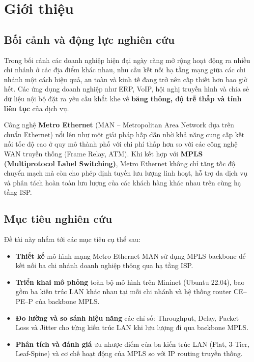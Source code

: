 \chapter{Giới thiệu}

\section{Bối cảnh và động lực nghiên cứu}

Trong bối cảnh các doanh nghiệp hiện đại ngày càng mở rộng hoạt động ra nhiều chi nhánh ở các địa điểm khác nhau, nhu cầu kết nối hạ tầng mạng giữa các chi nhánh một cách hiệu quả, an toàn và kinh tế đang trở nên cấp thiết hơn bao giờ hết. Các ứng dụng doanh nghiệp như ERP, VoIP, hội nghị truyền hình và chia sẻ dữ liệu nội bộ đặt ra yêu cầu khắt khe về \textbf{băng thông, độ trễ thấp và tính liên tục} của dịch vụ.

Công nghệ \textbf{Metro Ethernet} (MAN – Metropolitan Area Network dựa trên chuẩn Ethernet) nổi lên như một giải pháp hấp dẫn nhờ khả năng cung cấp kết nối tốc độ cao ở quy mô thành phố với chi phí thấp hơn so với các công nghệ WAN truyền thống (Frame Relay, ATM). Khi kết hợp với \textbf{MPLS (Multiprotocol Label Switching)}, Metro Ethernet không chỉ tăng tốc độ chuyển mạch mà còn cho phép định tuyến lưu lượng linh hoạt, hỗ trợ đa dịch vụ và phân tách hoàn toàn lưu lượng của các khách hàng khác nhau trên cùng hạ tầng ISP.

\section{Mục tiêu nghiên cứu}

Đề tài này nhắm tới các mục tiêu cụ thể sau:

\begin{itemize}
    \item \textbf{Thiết kế} mô hình mạng Metro Ethernet MAN sử dụng MPLS backbone để kết nối ba chi nhánh doanh nghiệp thông qua hạ tầng ISP.
    \item \textbf{Triển khai mô phỏng} toàn bộ mô hình trên Mininet (Ubuntu 22.04), bao gồm ba kiến trúc LAN khác nhau tại mỗi chi nhánh và hệ thống router CE–PE–P của backbone MPLS.
    \item \textbf{Đo lường và so sánh hiệu năng} các chỉ số: Throughput, Delay, Packet Loss và Jitter cho từng kiến trúc LAN khi lưu lượng đi qua backbone MPLS.
    \item \textbf{Phân tích và đánh giá} ưu nhược điểm của ba kiến trúc LAN (Flat, 3-Tier, Leaf-Spine) và cơ chế hoạt động của MPLS so với IP routing truyền thống.
\end{itemize}

